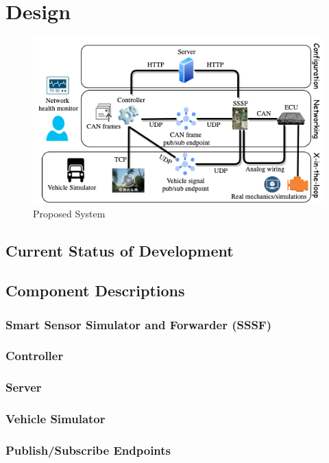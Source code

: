 \documentclass[letterpaper,twocolumn,12pt]{article}
\begin{document}
\section{Design}
\begin{figure}[t!]
    \centering
    \includegraphics[width=\linewidth]{images/system_design.drawio.png}
    \caption{Proposed System}
    \label{fig:goal}
\end{figure}

\subsection{Current Status of Development}

\subsection{Component Descriptions}
\subsubsection{Smart Sensor Simulator and Forwarder (SSSF)}
\subsubsection{Controller}
\subsubsection{Server}
\subsubsection{Vehicle Simulator}
\subsubsection{Publish/Subscribe Endpoints}
\end{document}

